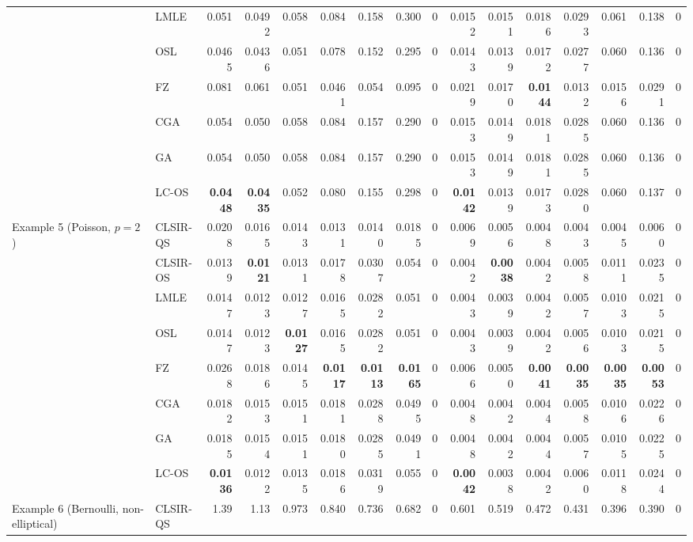 \begin{tabular}{llrrrrrrrrrrrrrr}
 & LMLE & 0.051 & 0.0492 & 0.058 & 0.084 & 0.158 & 0.300 & 0 & 0.0152 & 0.0151 & 0.0186 & 0.0293 & 0.061 & 0.138 & 0\\
 & OSL & 0.0465 & 0.0436 & 0.051 & 0.078 & 0.152 & 0.295 & 0 & 0.0143 & 0.0139 & 0.0172 & 0.0277 & 0.060 & 0.136 & 0\\
 & FZ & 0.081 & 0.061 & 0.051 & 0.0461 & 0.054 & 0.095 & 0 & 0.0219 & 0.0170 & \textbf{0.0144} & 0.0132 & 0.0156 & 0.0291 & 0\\
 & CGA & 0.054 & 0.050 & 0.058 & 0.084 & 0.157 & 0.290 & 0 & 0.0153 & 0.0149 & 0.0181 & 0.0285 & 0.060 & 0.136 & 0\\
 & GA & 0.054 & 0.050 & 0.058 & 0.084 & 0.157 & 0.290 & 0 & 0.0153 & 0.0149 & 0.0181 & 0.0285 & 0.060 & 0.136 & 0\\
 & LC-OS & \textbf{0.0448} & \textbf{0.0435} & 0.052 & 0.080 & 0.155 & 0.298 & 0 & \textbf{0.0142} & 0.0139 & 0.0173 & 0.0280 & 0.060 & 0.137 & 0\\
\addlinespace
Example 5 (Poisson, $p=2$) & CLSIR-QS & 0.0208 & 0.0165 & 0.0143 & 0.0131 & 0.0140 & 0.0185 & 0 & 0.0069 & 0.0056 & 0.0048 & 0.0043 & 0.0045 & 0.0060 & 0\\
 & CLSIR-OS & 0.0139 & \textbf{0.0121} & 0.0131 & 0.0178 & 0.0307 & 0.054 & 0 & 0.0042 & \textbf{0.0038} & 0.0042 & 0.0058 & 0.0111 & 0.0235 & 0\\
 & LMLE & 0.0147 & 0.0123 & 0.0127 & 0.0165 & 0.0282 & 0.051 & 0 & 0.0043 & 0.0039 & 0.0042 & 0.0057 & 0.0103 & 0.0215 & 0\\
 & OSL & 0.0147 & 0.0123 & \textbf{0.0127} & 0.0165 & 0.0282 & 0.051 & 0 & 0.0043 & 0.0039 & 0.0042 & 0.0056 & 0.0103 & 0.0215 & 0\\
 & FZ & 0.0268 & 0.0186 & 0.0145 & \textbf{0.0117} & \textbf{0.0113} & \textbf{0.0165} & 0 & 0.0066 & 0.0050 & \textbf{0.0041} & \textbf{0.0035} & \textbf{0.0035} & \textbf{0.0053} & 0\\
 & CGA & 0.0182 & 0.0153 & 0.0151 & 0.0181 & 0.0288 & 0.0495 & 0 & 0.0048 & 0.0042 & 0.0044 & 0.0058 & 0.0106 & 0.0226 & 0\\
 & GA & 0.0185 & 0.0154 & 0.0151 & 0.0180 & 0.0285 & 0.0491 & 0 & 0.0048 & 0.0042 & 0.0044 & 0.0057 & 0.0105 & 0.0225 & 0\\
 & LC-OS & \textbf{0.0136} & 0.0122 & 0.0135 & 0.0186 & 0.0319 & 0.055 & 0 & \textbf{0.0042} & 0.0038 & 0.0042 & 0.0060 & 0.0118 & 0.0244 & 0\\
\addlinespace
Example 6 (Bernoulli, non-elliptical) & CLSIR-QS & 1.39 & 1.13 & 0.973 & 0.840 & 0.736 & 0.682 & 0 & 0.601 & 0.519 & 0.472 & 0.431 & 0.396 & 0.390 & 0\\

\end{tabular}
